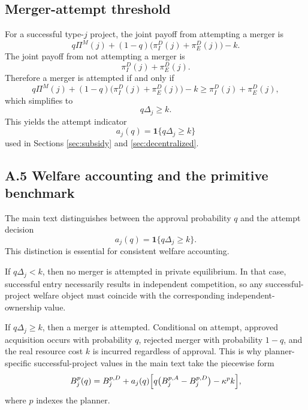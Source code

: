 \subsection{Merger-attempt threshold}

For a successful type-\(j\) project, the joint payoff from attempting a merger is
\begin{equation}
    q\Pi^M(j) + (1-q)\bigl(\pi_I^D(j)+\pi_E^D(j)\bigr) - k.
\end{equation}
The joint payoff from not attempting a merger is
\begin{equation}
    \pi_I^D(j)+\pi_E^D(j).
\end{equation}
Therefore a merger is attempted if and only if
\begin{equation}
    q\Pi^M(j) + (1-q)\bigl(\pi_I^D(j)+\pi_E^D(j)\bigr) - k
    \ge
    \pi_I^D(j)+\pi_E^D(j),
\end{equation}
which simplifies to
\begin{equation}
    q\Delta_j \ge k.
\end{equation}
This yields the attempt indicator
\begin{equation}
    a_j(q)=\mathbf{1}\{q\Delta_j \ge k\}
\end{equation}
used in Sections \ref{sec:subsidy} and \ref{sec:decentralized}.

\subsection*{A.5 Welfare accounting and the primitive benchmark}

The main text distinguishes between the approval probability \(q\) and the attempt decision
\begin{equation}
    a_j(q)=\mathbf{1}\{q\Delta_j\ge k\}.
\end{equation}
This distinction is essential for consistent welfare accounting.

If \(q\Delta_j<k\), then no merger is attempted in private equilibrium. In that case, successful
entry necessarily results in independent competition, so any successful-project welfare object must
coincide with the corresponding independent-ownership value.

If \(q\Delta_j\ge k\), then a merger is attempted. Conditional on attempt, approved acquisition
occurs with probability \(q\), rejected merger with probability \(1-q\), and the real resource cost \(k\)
is incurred regardless of approval. This is why planner-specific successful-project values in the main
text take the piecewise form
\begin{equation}
    B_j^p(q)=B_j^{p,D}+a_j(q)\Bigl[q\bigl(B_j^{p,A}-B_j^{p,D}\bigr)-\kappa^p k\Bigr],
\end{equation}
where \(p\) indexes the planner.

